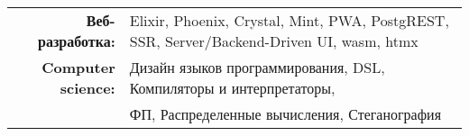 
\vspace{1em}
\begin{tabular}{rl}

    \textbf{Веб-разработка:} & Elixir, Phoenix, Crystal, Mint, PWA, PostgREST, SSR, Server/Backend-Driven UI, wasm, htmx \\
    \textbf{Computer science:} & Дизайн языков программирования, DSL, Компиляторы и интерпретаторы,\\
                               & ФП, Распределенные вычисления, Стеганография \\

\end{tabular}
